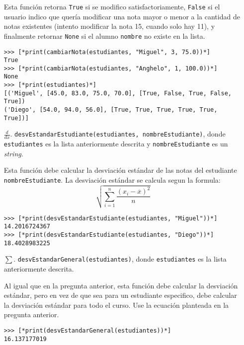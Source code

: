 \begin{enumerate}
    Esta función retorna \texttt{True} si se modifico satisfactoriamente, \texttt{False} si el usuario indico que quería modificar una nota mayor o menor a la cantidad de notas existentes (intento modificar la nota 15, cuando solo hay 11), %
    y finalmente retornar \texttt{None} si el alumno \texttt{nombre} no existe en la lista.

\begin{lstlisting}[style=consola]
>>> [*print(cambiarNota(estudiantes, "Miguel", 3, 75.0))*]
True
>>> [*print(cambiarNota(estudiantes, "Anghelo", 1, 100.0))*]
None
>>> [*print(estudiantes)*]
[('Miguel', [45.0, 83.0, 75.0, 70.0], [True, False, True, False, True])
('Diego', [54.0, 94.0, 56.0], [True, True, True, True, True, True])]
\end{lstlisting}

    \item[$\frac{d}{dx}$. ] \texttt{desvEstandarEstudiante(estudiantes, nombreEstudiante)}, donde \texttt{estudiantes} es la lista anteriormente descrita y \texttt{nombreEstudiante} es un \textit{string}.
    
    Esta función debe calcular la desviación estándar de las notas del estudiante \texttt{nombreEstudiante}. La desviación estándar se calcula segun la formula:
    \begin{equation*}
        \sqrt{\sum_{i=1}^{n}{\frac{(x_i - \overline{x})^2}{n}}}
    \end{equation*}

\begin{lstlisting}[style=consola]
>>> [*print(desvEstandarEstudiante(estudiantes, "Miguel"))*]
14.2016724367
>>> [*print(desvEstandarEstudiante(estudiantes, "Diego"))*]
18.4028983225
\end{lstlisting}

    \item[$\sum$. ] \texttt{desvEstandarGeneral(estudiantes)}, donde \texttt{estudiantes} es la lista anteriormente descrita.
    
    Al igual que en la pregunta anterior, esta función debe calcular la desviación estándar, pero en vez de que sea para un estudiante especifico, debe calcular la desviación estándar para todo el curso. Use la ecuación planteada en la pregunta anterior.

\begin{lstlisting}[style=consola]
>>> [*print(desvEstandarGeneral(estudiantes))*]
16.137177019
\end{lstlisting}


\end{enumerate}
